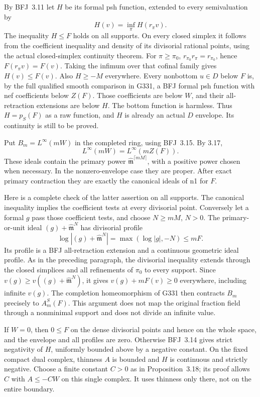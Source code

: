By BFJ~3.11 let $H$ be its formal psh function, extended to every semivaluation by
\[
 H(v)=\inf_{\pi}H(r_\pi v).
\]
The inequality $H\le F$ holds on all supports. On every closed simplex it follows from the coefficient inequality and density of its divisorial rational points, using the actual closed-simplex continuity theorem. For $\pi\ge\pi_0$, $r_{\pi_0}r_\pi=r_{\pi_0}$, hence $F(r_\pi v)=F(v)$. Taking the infimum over that cofinal family gives $H(v)\le F(v)$. Also $H\ge-M$ everywhere. Every nonbottom $u\in D$ below $F$ is, by the full qualified smooth comparison in G331, a BFJ formal psh function with nef coefficients below $Z(F)$. Those coefficients are below $W$, and their all-retraction extensions are below $H$. The bottom function is harmless. Thus $H=p_S(F)$ as a raw function, and $H$ is already an actual $D$ envelope. Its continuity is still to be proved.

Put $B_m=L^\infty(mW)$ in the completed ring, using BFJ~3.15. By 3.17,
\[
 L^\infty(mW)=L^\infty(mZ(F)). \tag{7}
\]
These ideals contain the primary power $\widehat{\mathfrak m}^{\lceil mM\rceil}$, with a positive power chosen when necessary. In the nonzero-envelope case they are proper. After exact primary contraction they are exactly the canonical ideals of n1 for $F$.

Here is a complete check of the latter assertion on all supports. The canonical inequality implies the coefficient tests at every divisorial point. Conversely let a formal $g$ pass those coefficient tests, and choose $N\ge mM$, $N>0$. The primary-or-unit ideal $(g)+\widehat{\mathfrak m}^N$ has divisorial profile
\[
 \log|(g)+\widehat{\mathfrak m}^N|=\max(\log|g|,-N)\le mF.
\]
Its profile is a BFJ all-retraction extension and a continuous geometric ideal profile. As in the preceding paragraph, the divisorial inequality extends through the closed simplices and all refinements of $\pi_0$ to every support. Since $v(g)\ge v((g)+\widehat{\mathfrak m}^N)$, it gives $v(g)+mF(v)\ge0$ everywhere, including infinite $v(g)$. The completion homeomorphism of G331 then contracts $B_m$ precisely to $A_m^S(F)$. This argument does not map the original fraction field through a nonminimal support and does not divide an infinite value.

If $W=0$, then $0\le F$ on the dense divisorial points and hence on the whole space, and the envelope and all profiles are zero. Otherwise BFJ~3.14 gives strict negativity of $H$, uniformly bounded above by a negative constant. On the fixed compact dual complex, thinness $A$ is bounded and $H$ is continuous and strictly negative. Choose a finite constant $C>0$ as in Proposition~3.18; its proof allows $C$ with $A\le-CW$ on this single complex. It uses thinness only there, not on the entire boundary.

